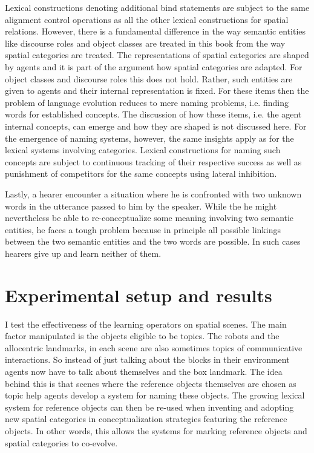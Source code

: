 Lexical constructions denoting additional bind statements are subject to the same
alignment control operations as all the other lexical constructions for spatial relations.
However, there is a fundamental difference in the way semantic entities like discourse roles and 
object classes are treated in this book from the way spatial categories are treated. 
The representations of spatial categories are shaped by agents and it is part of the argument
how spatial categories are adapted. For object classes
and discourse roles this does not hold. Rather, 
such entities are given to agents and their internal representation is fixed. 
For these items then the problem of language evolution reduces to mere naming 
problems, i.e. finding words for established concepts. The discussion of how these items, 
i.e.  the agent internal concepts, can emerge and how they are shaped is not discussed 
here. For the emergence of naming systems, however, the same 
insights apply as for the lexical systems involving categories. Lexical constructions for naming such
concepts are subject to continuous tracking of their respective success as well as punishment of competitors
for the same concepts using lateral inhibition. 

Lastly, a hearer encounter a situation where he is confronted 
with two unknown words in
the utterance passed to him by the speaker. While the he might 
nevertheless be able 
to re-conceptualize some meaning involving two semantic entities, 
he faces a tough problem because in principle all possible linkings 
between the two semantic entities and the two words are possible. 
In such cases hearers give up and learn neither of them. 

\section{Experimental setup and results}
I test the effectiveness of the learning operators on spatial scenes. 
The main factor manipulated
is the objects eligible to be topics. The robots and the allocentric landmarks, 
in each scene are also sometimes topics of communicative interactions. 
So instead of just talking about the blocks in their environment
agents now have to talk about themselves and the box landmark. The idea behind this is that 
scenes where the reference objects themselves are chosen as topic help agents develop a system for 
naming these objects. The growing lexical system for reference objects can then be re-used when 
inventing and adopting new spatial categories in conceptualization strategies featuring the reference objects.
In other words, this allows the systems for marking reference objects and spatial categories to co-evolve.

